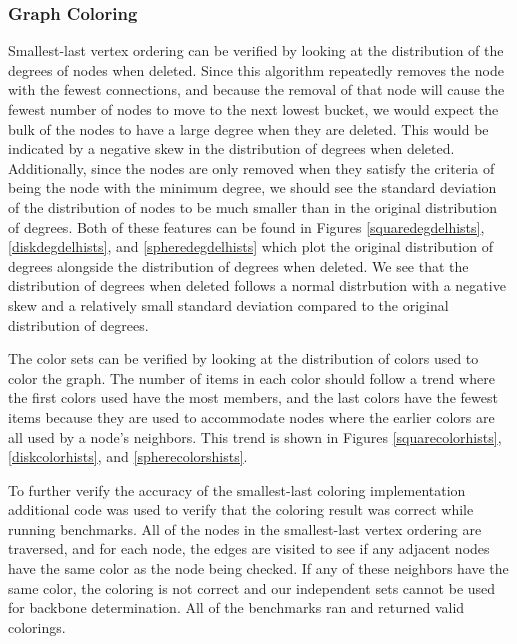 \documentclass{article}
\begin{document}
        \subsubsection{Graph Coloring}
        Smallest-last vertex ordering can be verified by looking at the distribution of the degrees of nodes when deleted. Since this algorithm repeatedly removes the node with the fewest connections, and because the removal of that node will cause the fewest number of nodes to move to the next lowest bucket, we would expect the bulk of the nodes to have a large degree when they are deleted. This would be indicated by a negative skew in the distribution of degrees when deleted. Additionally, since the nodes are only removed when they satisfy the criteria of being the node with the minimum degree, we should see the standard deviation of the distribution of nodes to be much smaller than in the original distribution of degrees. Both of these features can be found in Figures \ref{squaredegdelhists}, \ref{diskdegdelhists}, and \ref{spheredegdelhists} which plot the original distribution of degrees alongside the distribution of degrees when deleted. We see that the distribution of degrees when deleted follows a normal distrbution with a negative skew and a relatively small standard deviation compared to the original distribution of degrees.
        \par
        The color sets can be verified by looking at the distribution of colors used to color the graph. The number of items in each color should follow a trend where the first colors used have the most members, and the last colors have the fewest items because they are used to accommodate nodes where the earlier colors are all used by a node's neighbors. This trend is shown in Figures \ref{squarecolorhists}, \ref{diskcolorhists}, and \ref{spherecolorshists}.
        \par
        To further verify the accuracy of the smallest-last coloring implementation additional code was used to verify that the coloring result was correct while running benchmarks. All of the nodes in the smallest-last vertex ordering are traversed, and for each node, the edges are visited to see if any adjacent nodes have the same color as the node being checked. If any of these neighbors have the same color, the coloring is not correct and our independent sets cannot be used for backbone determination. All of the benchmarks ran and returned valid colorings.
\end{document}
